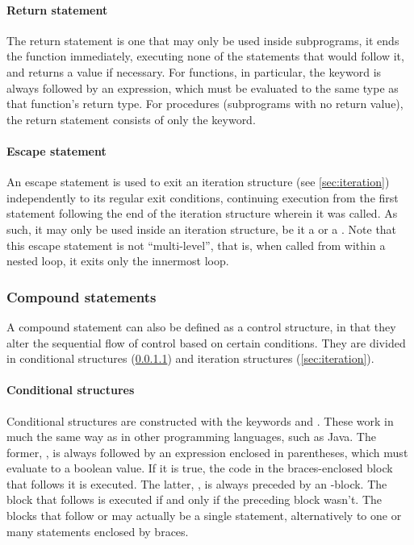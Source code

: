 
\paragraph{Return statement}
\label{sec:return}
The return statement is one that may only be used inside subprograms, it ends the function immediately, executing none of the statements that would follow it, and returns a value if necessary. For functions, in particular, the  keyword is always followed by an expression, which must be evaluated to the same type as that function's return type. For procedures (subprograms with no return value), the return statement consists of only the  keyword.

\paragraph{Escape statement}
\label{sec:escape}
An escape statement is used to exit an iteration structure (see \ref{sec:iteration}) independently to its regular exit conditions, continuing execution from the first statement following the end of the iteration structure wherein it was called. As such, it may only be used inside an iteration structure, be it a  or a . Note that this escape statement is not ``multi-level'', that is, when called from within a nested loop, it exits only the innermost loop.

\subsubsection{Compound statements}
\label{sec:compound-stmts}
A compound statement can also be defined as a control structure, in that they alter the sequential flow of control based on certain conditions. They are divided in conditional structures (\ref{sec:conditional}) and iteration structures (\ref{sec:iteration}).

\paragraph{Conditional structures}
\label{sec:conditional}
Conditional structures are constructed with the keywords  and . These work in much the same way as in other programming languages, such as Java. The former, , is always followed by an expression enclosed in parentheses, which must evaluate to a boolean value. If it is true, the code in the braces-enclosed block that follows it is executed. The latter, , is always preceded by an -block. The block that follows  is executed if and only if the preceding block wasn't. The blocks that follow  or  may actually be a single statement, alternatively to one or many statements enclosed by braces.

